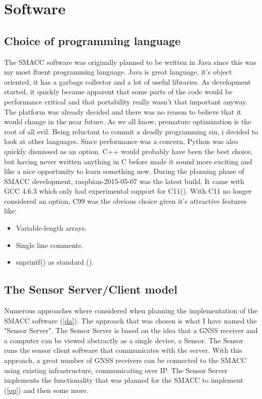 \documentclass[12pt,english,a4paper]{report}
\begin{document}
\chapter{Software}
\section{Choice of programming language}
The SMACC software was originally planned to be written in Java since this was my most fluent programming language. Java is great language, it's object oriented, it has a garbage collector and a lot of useful libraries. As development started, it quickly became apparent that some parts of the code would be performance critical and that portability really wasn't that important anyway. The platform was already decided and there was no reason to believe that it would change in the near future. As we all know, premature optimization is the root of all evil. Being reluctant to commit a deadly programming sin, i decided to look at other languages. Since performance was a concern, Python was also quickly dismissed as an option. C++ would probably have been the best choice, but having never written anything in C before made it sound more exciting and like a nice opportunity to learn something new. During the planning phase of SMACC development, raspbian-2015-05-07 was the latest build. It came with GCC 4.6.3 which only had experimental support for C11(\cite{GCC11}). With C11 no longer considered an option, C99 was the obvious choice given it's attractive features like:
\begin{itemize}
  \item Variable-length arrays.
  \item Single line comments.
  \item snprintf() as standard (\cite{C_RATIONAL}).
\end{itemize}

\section{The Sensor Server/Client model}
Numerous approaches where considered when planning the implementation of the SMACC software (\ref{da}). The approach that was chosen is what I have named the "Sensor Server". The Sensor Server is based on the idea that a GNSS receiver and a computer can be viewed abstractly as a single device, a Sensor. The Sensor runs the sensor client software that communicates with the server. With this approach, a great number of GNSS receivers can be connected to the SMACC using existing infrastructure, communicating over IP. The Sensor Server implements the functionality that was planned for the SMACC to implement (\ref{op}) and then some more.
\end{document}
